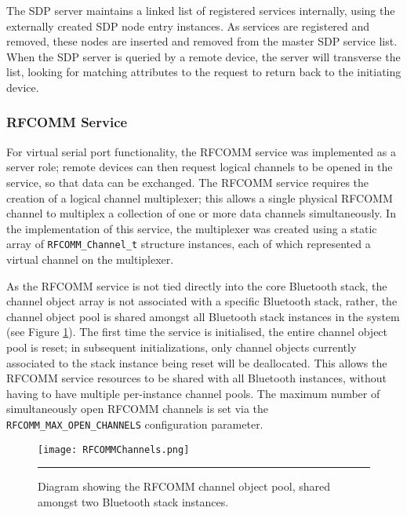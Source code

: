 

The SDP server maintains a linked list of registered services internally, using the externally created SDP node entry instances. As services are registered and removed, these nodes are inserted and removed from the master SDP service list. When the SDP server is queried by a remote device, the server will transverse the list, looking for matching attributes to the request to return back to the initiating device.

\FloatBarrier
\subsubsection{RFCOMM Service}

For virtual serial port functionality, the RFCOMM service was implemented as a server role; remote devices can then request logical channels to be opened in the service, so that data can be exchanged. The RFCOMM service requires the creation of a logical channel multiplexer; this allows a single physical RFCOMM channel to multiplex a collection of one or more data channels simultaneously. In the implementation of this service, the multiplexer was created using a static array of \lstinline{RFCOMM_Channel_t} structure instances, each of which represented a virtual channel on the multiplexer.

As the RFCOMM service is not tied directly into the core Bluetooth stack, the channel object array is not associated with a specific Bluetooth stack, rather, the channel object pool is shared amongst all Bluetooth stack instances in the system (see Figure \ref{fig:rfcommchannelpool}). The first time the service is initialised, the entire channel object pool is reset; in subsequent initializations, only channel objects currently associated to the stack instance being reset will be deallocated. This allows the RFCOMM service resources to be shared with all Bluetooth instances, without having to have multiple per-instance channel pools. The maximum number of simultaneously open RFCOMM channels is set via the \lstinline{RFCOMM_MAX_OPEN_CHANNELS} configuration parameter.

\begin{figure}[tbph]
	\vspace{1em}
	\centering
		\texttt{[image: RFCOMMChannels.png]}
	\rule{35em}{0.5pt}
	\caption[Diagram of the shared RFCOMM Channel pool.]{Diagram showing the RFCOMM channel object pool, shared amongst two Bluetooth stack instances.}
	\label{fig:rfcommchannelpool}
\end{figure}

